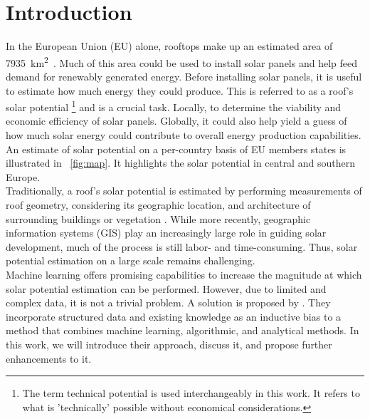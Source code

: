 \documentclass{article} %
\newcommand{\figref}[1]{\figurename~\ref{#1}}
\begin{document}
\section*{Introduction}
In the European Union (EU) alone, rooftops make up an estimated area of \SI{7935}{\kilo\metre\squared}~\cite{bodis2019high}. Much of this area could be used to install solar panels and help feed demand for renewably generated energy. Before installing solar panels, it is useful to estimate how much energy they could produce. This is referred to as a roof's solar potential \footnote{The term technical potential is used interchangeably in this work. It refers to what is 'technically' possible without economical considerations.} and is a crucial task. Locally, to determine the viability and economic efficiency of solar panels. Globally, it could also help yield a guess of how much solar energy could contribute to overall energy production capabilities. An estimate of solar potential on a per-country basis of EU members states is illustrated in \figref{fig:map}. It highlights the solar potential in central and southern Europe.\\
Traditionally, a roof's solar potential is estimated by performing measurements of roof geometry, considering its geographic location, and architecture of surrounding buildings or vegetation \cite{freitas2015modelling}. While more recently, geographic information systems (GIS) play an increasingly large role in guiding solar development, much of the process is still labor- and time-consuming. Thus, solar potential estimation on a large scale remains challenging.\\
Machine learning offers promising capabilities to increase the magnitude at which solar potential estimation can be performed. However, due to limited and complex data, it is not a trivial problem. A solution is proposed by \citet{de2021predicting}. They incorporate structured data and existing knowledge as an inductive bias to a method that combines machine learning, algorithmic, and analytical methods. In this work, we will introduce their approach, discuss it, and propose further enhancements to it.
\end{document}
